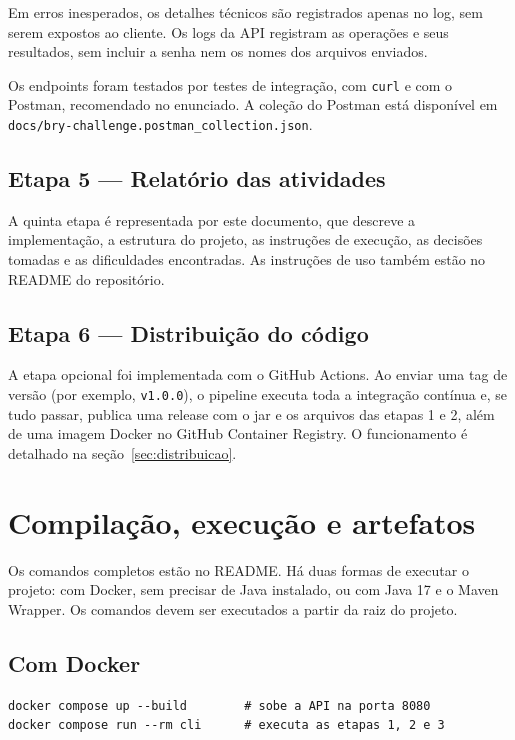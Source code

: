 \documentclass[12pt,a4paper]{article}
\begin{document}
Em erros inesperados, os detalhes técnicos são registrados apenas no log, sem serem expostos ao cliente. Os logs da API registram as operações e seus resultados, sem incluir a senha nem os nomes dos arquivos enviados.

Os endpoints foram testados por testes de integração, com \texttt{curl} e com o Postman, recomendado no enunciado. A coleção do Postman está disponível em \texttt{docs/bry-challenge.postman\_collection.json}.

\subsection{Etapa 5 --- Relatório das atividades}

A quinta etapa é representada por este documento, que descreve a implementação, a estrutura do projeto, as instruções de execução, as decisões tomadas e as dificuldades encontradas. As instruções de uso também estão no README do repositório.

\subsection{Etapa 6 --- Distribuição do código}

A etapa opcional foi implementada com o GitHub Actions. Ao enviar uma tag de versão (por exemplo, \texttt{v1.0.0}), o pipeline executa toda a integração contínua e, se tudo passar, publica uma release com o jar e os arquivos das etapas 1 e 2, além de uma imagem Docker no GitHub Container Registry. O funcionamento é detalhado na seção~\ref{sec:distribuicao}.

\section{Compilação, execução e artefatos}

Os comandos completos estão no README. Há duas formas de executar o projeto: com Docker, sem precisar de Java instalado, ou com Java 17 e o Maven Wrapper. Os comandos devem ser executados a partir da raiz do projeto.

\subsection{Com Docker}

\begin{lstlisting}
docker compose up --build        # sobe a API na porta 8080
docker compose run --rm cli      # executa as etapas 1, 2 e 3
\end{lstlisting}
\end{document}
